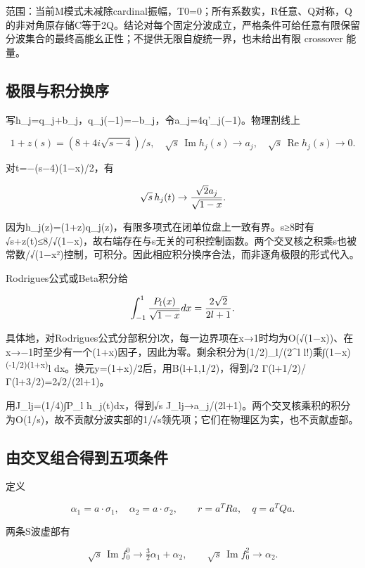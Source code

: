 \documentclass[
  10pt,
  a4paper,
]{article}
\begin{document}
范围：当前M模式未减除cardinal振幅，T0=0；所有系数实，R任意、Q对称，Q的非对角原存储C等于2Q。结论对每个固定分波成立，严格条件可给任意有限保留分波集合的最终高能幺正性；不提供无限自旋统一界，也未给出有限
crossover 能量。

\subsection{极限与积分换序}\label{ux6781ux9650ux4e0eux79efux5206ux6362ux5e8f}

写h\_j=q\_j+b\_j，q\_j(−1)=−b\_j，令a\_j=4q'\_j(−1)。物理割线上

\[
1+z(s)=(8+4i\sqrt{s-4})/s,
\quad\sqrt{s}\,\operatorname{Im}h_j(s)\to a_j,
\quad\sqrt{s}\,\operatorname{Re}h_j(s)\to0.
\]

对t=−(s−4)(1−x)/2，有

\[
\sqrt{s}\,h_j(t)\to {\sqrt2 a_j\over\sqrt{1-x}}.
\]

因为h\_j(z)=(1+z)\widetilde q\_j(z)，有限多项式在闭单位盘上一致有界。s≥8时有√s+z(t)\textbar≤8/√(1−x)，故右端存在与s无关的可积控制函数。两个交叉核之积乘s也被常数/√(1−x²)控制，可积分。因此相应积分换序合法，而非逐角极限的形式代入。

Rodrigues公式或Beta积分给

\[
\int_{-1}^{1}{P_l(x)\over\sqrt{1-x}}dx={2\sqrt2\over2l+1}.
\]

具体地，对Rodrigues公式分部积分l次，每一边界项在x→1时均为O(√(1−x))、在x→−1时至少有一个(1+x)因子，因此为零。剩余积分为(1/2)\_l/(2\^{}l
l!)乘∫(1−x)\textsuperscript{(-1/2)(1+x)}l
dx。换元y=(1+x)/2后，用B(l+1,1/2)，得到√2 Γ(l+1/2)/Γ(l+3/2)=2√2/(2l+1)。

用J\_lj=(1/4)∫P\_l h\_j(t)dx，得到√s
J\_lj→a\_j/(2l+1)。两个交叉核乘积的积分为O(1/s)，故不贡献分波实部的1/√s领先项；它们在物理区为实，也不贡献虚部。

\subsection{由交叉组合得到五项条件}\label{ux7531ux4ea4ux53c9ux7ec4ux5408ux5f97ux5230ux4e94ux9879ux6761ux4ef6}

定义

\[
\alpha_1=a\cdot\sigma_1,\quad\alpha_2=a\cdot\sigma_2,
\qquad r=a^TRa,\quad q=a^TQa.
\]

两条S波虚部有

\[
\sqrt{s}\,\operatorname{Im}f_0^0\to\tfrac32\alpha_1+\alpha_2,
\qquad\sqrt{s}\,\operatorname{Im}f_0^2\to\alpha_2.
\]
\end{document}
